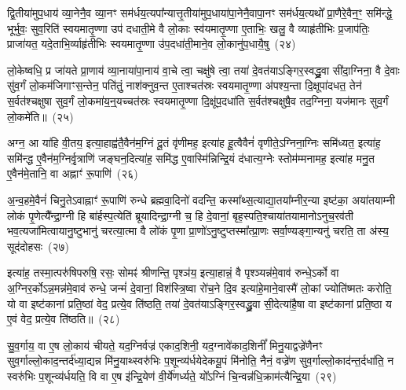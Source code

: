 द्वि॒तीया॑मुप॒धाय॑ व्या॒नेनै॒व व्या॒नꣳ सम॑र्धय॒त्यपा᳚न्यात्तृ॒तीया॑मुप॒धाया॑पा॒नेनै॒वापा॒नꣳ सम॑र्धय॒त्यथो᳚ प्रा॒णैरे॒वैन॒ꣳ॒ समि॑न्द्धे॒ भूर्भुवः॒ सुव॒रिति॑ स्वयमातृ॒ण्णा उप॑ दधाती॒मे वै लो॒काः स्व॑यमातृ॒ण्णा ए॒ताभिः॒ खलु॒ वै व्याहृ॑तीभिः प्र॒जा\-प॑तिः॒ प्राजा॑यत॒ यदे॒ताभि॒र्व्याहृ॑तीभिः स्वयमातृ॒ण्णा उ॑प॒दधा॑ती॒माने॒व लो॒कानु॑प॒धायै॒षु~(२४)

लो॒केष्वधि॒ प्र जा॑यते प्रा॒णाय॑ व्या॒नाया॑पा॒नाय॑ वा॒चे त्वा॒ चक्षु॑षे त्वा॒ तया॑ दे॒वत॑या\-ऽ\-ङ्गिर॒स्वद्ध्रु॒वा सी॑दा॒ग्निना॒ वै दे॒वाः सु॑व॒र्गं लो॒कम॑जिगाꣳस॒न्तेन॒ पति॑तुं॒ नाश॑क्नुव॒न्त ए॒ताश्चत॑स्रः स्वयमातृ॒ण्णा अ॑पश्य॒न्ता दि॒क्षूपा॑दधत॒ तेन॑ स॒र्वत॑श्चक्षुषा सुव॒र्गं लो॒कमा॑य॒न्॒यच्चत॑स्रः स्वयमातृ॒ण्णा दि॒क्षू॑प॒दधा॑ति स॒र्वत॑श्चक्षुषै॒व तद॒ग्निना॒ यज॑मानः सुव॒र्गं लो॒कमे॑ति॥~(२५)

{\anuvakamend[{ब्र॒ह्म॒वा॒दिनो॒ व्य॑न्यादे॒षु यज॑मान॒स्त्रीणि॑ च}]}%

अग्न॒ आ या॑हि वी॒तय॒ इत्या॒हाह्व॑तै॒वैन॑म॒ग्निं दू॒तं वृ॑णीमह॒ इत्या॑ह हू॒त्वैवैनं॑ वृणीते॒\-ऽग्निना॒ग्निः समि॑ध्यत॒ इत्या॑ह॒ समि॑न्द्ध ए॒वैन॑म॒ग्निर्वृ॒त्राणि॑ जङ्घन॒दित्या॑ह॒ समि॑द्ध ए॒वास्मि॑न्निन्द्रि॒यं द॑धात्य॒ग्नेः स्तोम॑म्मनामह॒ इत्या॑ह मनु॒त ए॒वैन॑मे॒तानि॒ वा अह्नाꣳ॑ रू॒पाणि॑~(२६)

अ॒न्व॒हमे॒वैनं॑ चिनु॒ते\-ऽवाह्नाꣳ॑ रू॒पाणि॑ रुन्धे ब्रह्मवा॒दिनो॑ वदन्ति॒ कस्मा᳚थ्स॒त्याद्या॒तया᳚म्नीर॒न्या इष्ट॑का॒ अया॑तयाम्नी लोकं पृ॒णेत्यै᳚न्द्रा॒ग्नी हि बा॑र्\mbox{}हस्प॒त्येति॑ ब्रूयादिन्द्रा॒ग्नी च॒ हि दे॒वानां॒ बृह॒स्पति॒श्चाया॑तयामानो\-ऽनुच॒रव॑ती भव॒त्यजा॑मित्वायानु॒ष्टुभानु॑ चरत्या॒त्मा वै लो॑कं पृ॒णा प्रा॒णो॑\-ऽनु॒ष्टुप्तस्मा᳚त्प्रा॒णः सर्वा॒ण्यङ्गा॒न्यनु॑ चरति॒ ता अ॑स्य॒ सूद॑दोहसः~(२७)

इत्या॑ह॒ तस्मा॒त्परु॑षिपरुषि॒ रसः॒ सोमꣴ॑ श्रीणन्ति॒ पृश्ञ॑य॒ इत्या॒हान्नं॒ वै पृश्ञ्यन्न॑मे॒वाव॑ रुन्धे॒\-ऽर्को वा अ॒ग्निर॒र्को\-ऽन्न॒मन्न॑मे॒वाव॑ रुन्धे॒ जन्मं॑ दे॒वानां॒ विश॑स्त्रि॒ष्वा रो॑च॒ने दि॒व इत्या॑हे॒माने॒वास्मै॑ लो॒कां ज्योति॑ष्मतः करोति॒ यो वा इष्ट॑कानां प्रति॒ष्ठां वेद॒ प्रत्ये॒व ति॑ष्ठति॒ तया॑ दे॒वत॑या\-ऽ\-ङ्गिर॒स्वद्ध्रु॒वा सी॒देत्या॑है॒षा वा इष्ट॑कानां प्रति॒ष्ठा य ए॒वं वेद॒ प्रत्ये॒व ति॑ष्ठति॥~(२८)

{\anuvakamend[{रू॒पाणि॒ सूद॑दोहस॒स्तया॒ षोड॑श च}]}%

सु॒व॒र्गाय॒ वा ए॒ष लो॒काय॑ चीयते॒ यद॒ग्निर्वज्र॑ एकाद॒शिनी॒ यद॒ग्नावे॑काद॒शिनीं᳚ मिनु॒याद्वज्रे॑णैनꣳ सुव॒र्गाल्लो॒का\-द॒न्तर्द॑ध्या॒द्यन्न मि॑नु॒याथ्स्वरु॑भिः प॒शून्व्य॑र्धयेदेकयू॒पं मि॑नोति॒ नैनं॒ वज्रे॑ण सुव॒र्गाल्लो॒काद॑न्त॒र्दधा॑ति॒ न स्वरु॑भिः प॒शून्व्य॑र्धयति॒ वि वा ए॒ष इ॑न्द्रि॒येण॑ वी॒र्ये॑णर्ध्यते॒ यो᳚\-ऽग्निं चि॒न्वन्न॑धि॒क्राम॑त्यैन्द्रि॒या~(२९)

